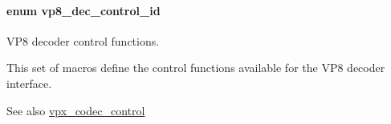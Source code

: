 \paragraph[{\texorpdfstring{vp8\+\_\+dec\+\_\+control\+\_\+id}{vp8_dec_control_id}}]{\setlength{\rightskip}{0pt plus 5cm}enum {\bf vp8\+\_\+dec\+\_\+control\+\_\+id}}\hypertarget{group__vp8__decoder_gaf9dd3f2e6d1412106ee791af768e57c1}{}\label{group__vp8__decoder_gaf9dd3f2e6d1412106ee791af768e57c1}


V\+P8 decoder control functions. 

This set of macros define the control functions available for the V\+P8 decoder interface.

\begin{DoxySeeAlso}{See also}
\hyperlink{group__codec_gac1b91e04698c1bd4c0a2b8aa85b08cd2}{vpx\+\_\+codec\+\_\+control} 
\end{DoxySeeAlso}
